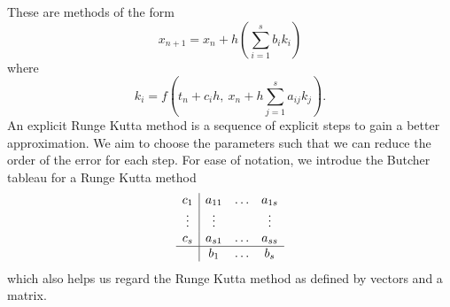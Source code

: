 \documentclass{report}
\theoremstyle{exampstyle} \newtheorem{example}[theorem]{Example}
\theoremstyle{exampstyle} \newtheorem{remark}[theorem]{Remark}
\theoremstyle{exampstyle} \newtheorem{definition}[theorem]{Definition}
\theoremstyle{exampstyle} \newtheorem{lemma}[theorem]{Lemma}
\begin{document}
These are methods of the form
\begin{equation*}
	x_{n+1} = x_n + h(\sum_{i = 1}^{s} b_i k_i )
\end{equation*}
where
\begin{equation*}
	k_i = f(t_n + c_i h,~ x_n + h\sum_{j = 1}^{s} a_{ij}k_j).	
\end{equation*}
An explicit Runge Kutta method is a sequence of explicit steps to gain a better approximation.
We aim to choose the parameters such that we can reduce the order of the error for each step.
For ease of notation, we introdue the Butcher tableau for a Runge Kutta method
\begin{equation*}
	\begin{array}{c|ccc}
		c_1  &a_{11} &\hdots &a_{1s} \\
		\vdots &\vdots & &\vdots \\
		c_s &a_{s1} &\hdots &a_{ss} \\
		\hline
		 &b_1 &\hdots &b_s
	\end{array}
\end{equation*}
which also helps us regard the Runge Kutta method as defined by vectors and a matrix.
\end{document}
